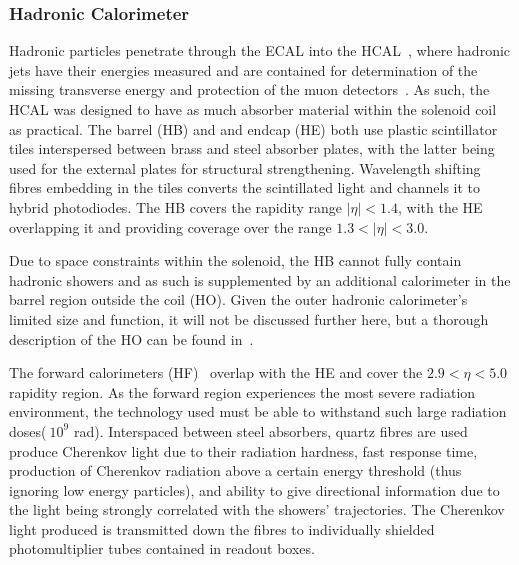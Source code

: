 \subsubsection{Hadronic Calorimeter}\label{subsubsec:HCAL}
Hadronic particles penetrate through the ECAL into the HCAL~\cite{CMS:1997xji}, where hadronic jets have their energies measured and are contained for determination of the missing transverse energy and protection of the muon detectors~\cite{HCAL:tdr}.
As such, the HCAL was designed to have as much absorber material within the solenoid coil as practical. 
The barrel (HB) and and endcap (HE) both use plastic scintillator tiles interspersed between brass and steel absorber plates, with the latter being used for the external plates for structural strengthening.
Wavelength shifting fibres embedding in the tiles converts the scintillated light and channels it to hybrid photodiodes.
The HB covers the rapidity range $|\eta| < 1.4$, with the HE overlapping it and providing coverage over the range $1.3 < |\eta| < 3.0$.

Due to space constraints within the solenoid, the HB cannot fully contain hadronic showers and as such is supplemented by an additional calorimeter in the barrel region outside the coil (HO). Given the outer hadronic calorimeter's limited size and function, it will not be discussed further here, but a thorough description of the HO can be found in~\cite{HO}.

The forward calorimeters (HF)~\cite{HF} overlap with the HE and cover the $2.9 < \eta < 5.0$ rapidity region.
As the forward region experiences the most severe radiation environment, the technology used must be able to withstand such large radiation doses($~10^{9}$ rad). 
Interspaced between steel absorbers, quartz fibres are used produce Cherenkov light due to their radiation hardness, fast response time, production of Cherenkov radiation above a certain energy threshold (thus ignoring low energy particles), and ability to give directional information due to the light being strongly correlated with the showers' trajectories.
The Cherenkov light produced is transmitted down the fibres to individually shielded photomultiplier tubes contained in readout boxes.

